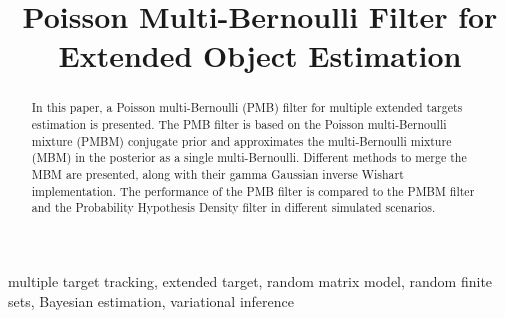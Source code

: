 \documentclass[conference]{IEEEtran}
\begin{document}
\title{Poisson Multi-Bernoulli Filter for Extended Object Estimation\\
}

\author{
\and
{}
\and
{}
}

\maketitle

\begin{abstract}
In this paper, a Poisson multi-Bernoulli (PMB) filter for multiple extended targets estimation is presented. The PMB filter is based on the Poisson multi-Bernoulli mixture (PMBM) conjugate prior and approximates the multi-Bernoulli mixture (MBM) in the posterior as a single multi-Bernoulli. Different methods to merge the MBM are presented, along with their gamma Gaussian inverse Wishart implementation. The performance of the PMB filter is compared to the PMBM filter and the Probability Hypothesis Density filter in different simulated scenarios. 
\end{abstract}

\begin{IEEEkeywords}
multiple target tracking, extended target, random matrix model, random finite sets, Bayesian estimation, variational inference
\end{IEEEkeywords}
\end{document}
